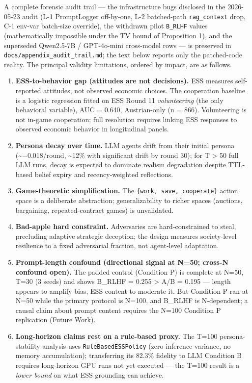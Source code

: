 

A complete forensic audit trail — the infrastructure bugs disclosed in the 2026-05-23 audit (L-1 PromptLogger off-by-one, L-2 batched-path \texttt{rag\_context} drop, C-1 env-var batch-size override), the withdrawn pilot \texttt{B\_RLHF} values (mathematically impossible under the TV bound of Proposition 1), and the superseded Qwen2.5-7B / GPT-4o-mini cross-model rows — is preserved in \texttt{docs/appendix\_audit\_trail.md}; the text below reports only the patched-code reality. The principal validity limitations, ordered by impact, are as follows.

\begin{enumerate}
\item \textbf{ESS-to-behavior gap (attitudes are not decisions).} ESS measures self-reported attitudes, not observed economic choices. The cooperation baseline is a logistic regression fitted on ESS Round 11 \textit{volunteering} (the only behavioral variable), AUC = 0.640, Austrian-only (n = 866). Volunteering is not in-game cooperation; full resolution requires linking ESS responses to observed economic behavior in longitudinal panels.
\item \textbf{Persona decay over time.} LLM agents drift from their initial persona (\textasciitilde{}−0.018/round, \textasciitilde{}12\% with significant drift by round 30); for T > 50 full LLM runs, decay is expected to dominate realism degradation despite TTL-based belief expiry and recency-weighted reflections.
\item \textbf{Game-theoretic simplification.} The \texttt{\{work, save, cooperate\}} action space is a deliberate abstraction; generalizability to richer spaces (auctions, bargaining, repeated-contract games) is unvalidated.
\item \textbf{Bad-apple hard constraint.} Adversaries are hard-constrained to steal, precluding adaptive strategic deception; the design measures society-level resilience to a fixed adversarial fraction, not agent-level adaptation.
\item \textbf{Prompt-length confound (directional signal at N=50; cross-N confound open).} The padded control (Condition P) is complete at N=50, T=30 (3 seeds) and shows B\_RLHF = 0.255 > A/B = 0.195 — length appears to amplify bias, ESS content to moderate it. But Condition P ran at N=50 while the primary protocol is N=100, and B\_RLHF is N-dependent; a causal claim about prompt content requires the N=100 Condition P replication (Future Work).
\item \textbf{Long-horizon claims rest on a rule-based proxy.} The T=100 persona-stability analysis uses \texttt{RuleBasedESSPolicy} (zero inference variance, no memory accumulation); transferring its 82.3\% fidelity to LLM Condition B requires long-horizon GPU runs not yet executed — the T=100 result is a \textit{lower bound} on what ESS grounding can achieve.

\end{enumerate}
